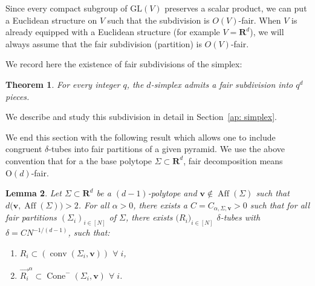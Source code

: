 \documentclass[10pt]{amsart}
\newcommand\translate[2]{\overrightarrow{#1}^{#2}}
\newcommand{\R}{\mathbf{R}}
\newcommand{\ocone}[2]{\operatorname{Cone}^-(#1,#2)}
\newtheorem{theorem}{Theorem}[section]
\newtheorem{lemma}[theorem]{Lemma}
\begin{document}
Since every compact subgroup of $\mathrm{GL}(V)$ preserves a scalar product, we can put a Euclidean structure on $V$ such that the subdivision is $O(V)$-fair. When $V$ is already equipped with a Euclidean structure (for example $V=\R^d$), we will always assume that the fair subdivision (partition) is $O(V)$-fair.

We record here the existence of fair subdivisions of the simplex:
\begin{theorem}\label{thm:CFK}\cite{Coxeter34,Freudenthal42} For every integer $q$, the $d$-simplex admits a fair subdivision into $q^d$ pieces.
\end{theorem}
\noindent We describe and study this subdivision in detail in Section~\ref{ap: simplex}.

We end this section with the following result which allows one to include congruent $\delta$-tubes into fair partitions of a given pyramid. We use the above convention that for a the base polytope $\Sigma\subset \R^d$, fair decomposition means $\mathrm{O}(d)$-fair.
\begin{lemma}\label{lemma: tubes inside perron}
Let $\Sigma \subset \R^d$ be a $(d-1)$-polytope and $\mathbf{v}\notin \operatorname{Aff}(\Sigma)$ such that $d\big(\mathbf{v},\operatorname{Aff}(\Sigma)\big)>2$. For all $\alpha>0$, there exists a $C=C_{\alpha,\Sigma,\mathbf{v}}>0$ such that for all fair partitions $(\Sigma_i)_{i\in [N]}$ of $\Sigma$, there exists $\big(R_i\big)_{i\in [N]}$ $\delta$-tubes with $\delta=CN^{-1/(d-1)}$,  such that:
\begin{enumerate}
    \item $R_i\subset (\operatorname{conv}(\Sigma_i,\mathbf{v}))$ $\forall\;i$,
    \item $\translate{R_i}{\alpha} \subset \ocone{\Sigma_i}{\mathbf{v}}$ $\forall\;i$.
\end{enumerate}
\end{lemma}
\end{document}
